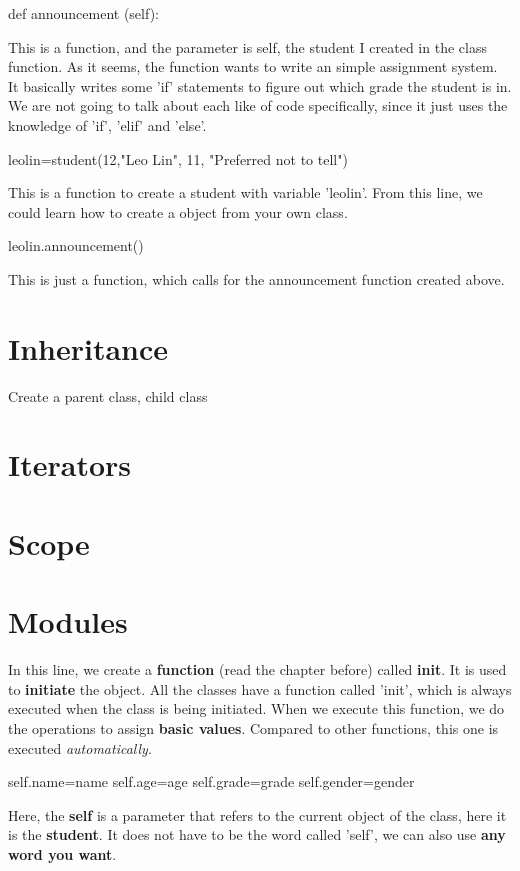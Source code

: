 \documentclass[12pt]{article}
\begin{document}
\begin{python}
	def announcement (self):
\end{python}
\par This is a function, and the parameter is self, the student I created in the class function.
As it seems, the function wants to write an simple assignment system.
It basically writes some 'if' statements to figure out which grade the student is in. We are not going to talk about each like of code specifically, since it just uses the knowledge of 'if', 'elif' and 'else'.
\begin{python}
	leolin=student(12,"Leo Lin", 11, "Preferred not to tell")
\end{python}
\par This is a function to create a student with variable 'leolin'.
From this line, we could learn how to create a object from your own class.
\begin{python}
	leolin.announcement()
\end{python}
This is just a function, which calls for the announcement function created above.
\section{Inheritance}
Create a parent class, child class
\section{Iterators}
\section{Scope}
\section{Modules}

\par In this line, we create a \textbf{function} (read the chapter before) called \textbf{init}. It is used to \textbf{initiate} the object. All the classes have a function called 'init', which is always executed when the class is being initiated. When we execute this function, we do the operations to assign \textbf{basic values}. Compared to other functions, this one is executed \textit{automatically}.
\begin{python}
  self.name=name	
	self.age=age
	self.grade=grade
	self.gender=gender
\end{python}
\par Here, the \textbf{self} is a parameter that refers to the current object of the class, here it is the \textbf{student}. It does not have to be the word called 'self', we can also use \textbf{any word you want}.
\end{document}
